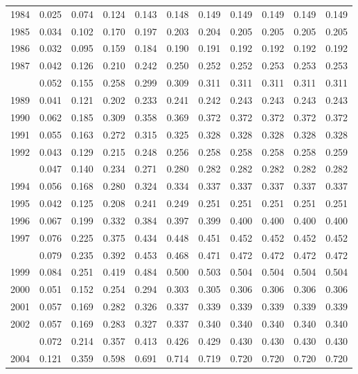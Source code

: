\documentclass[
]{article}
\begin{document}
\begin{longtable}[t]{lrrrrrrrrrr}
1984 & 0.025 & 0.074 & 0.124 & 0.143 & 0.148 & 0.149 & 0.149 & 0.149 & 0.149 & 0.149\\
1985 & 0.034 & 0.102 & 0.170 & 0.197 & 0.203 & 0.204 & 0.205 & 0.205 & 0.205 & 0.205\\
1986 & 0.032 & 0.095 & 0.159 & 0.184 & 0.190 & 0.191 & 0.192 & 0.192 & 0.192 & 0.192\\
1987 & 0.042 & 0.126 & 0.210 & 0.242 & 0.250 & 0.252 & 0.252 & 0.253 & 0.253 & 0.253\\
\addlinespace
1988 & 0.052 & 0.155 & 0.258 & 0.299 & 0.309 & 0.311 & 0.311 & 0.311 & 0.311 & 0.311\\
1989 & 0.041 & 0.121 & 0.202 & 0.233 & 0.241 & 0.242 & 0.243 & 0.243 & 0.243 & 0.243\\
1990 & 0.062 & 0.185 & 0.309 & 0.358 & 0.369 & 0.372 & 0.372 & 0.372 & 0.372 & 0.372\\
1991 & 0.055 & 0.163 & 0.272 & 0.315 & 0.325 & 0.328 & 0.328 & 0.328 & 0.328 & 0.328\\
1992 & 0.043 & 0.129 & 0.215 & 0.248 & 0.256 & 0.258 & 0.258 & 0.258 & 0.258 & 0.259\\
\addlinespace
1993 & 0.047 & 0.140 & 0.234 & 0.271 & 0.280 & 0.282 & 0.282 & 0.282 & 0.282 & 0.282\\
1994 & 0.056 & 0.168 & 0.280 & 0.324 & 0.334 & 0.337 & 0.337 & 0.337 & 0.337 & 0.337\\
1995 & 0.042 & 0.125 & 0.208 & 0.241 & 0.249 & 0.251 & 0.251 & 0.251 & 0.251 & 0.251\\
1996 & 0.067 & 0.199 & 0.332 & 0.384 & 0.397 & 0.399 & 0.400 & 0.400 & 0.400 & 0.400\\
1997 & 0.076 & 0.225 & 0.375 & 0.434 & 0.448 & 0.451 & 0.452 & 0.452 & 0.452 & 0.452\\
\addlinespace
1998 & 0.079 & 0.235 & 0.392 & 0.453 & 0.468 & 0.471 & 0.472 & 0.472 & 0.472 & 0.472\\
1999 & 0.084 & 0.251 & 0.419 & 0.484 & 0.500 & 0.503 & 0.504 & 0.504 & 0.504 & 0.504\\
2000 & 0.051 & 0.152 & 0.254 & 0.294 & 0.303 & 0.305 & 0.306 & 0.306 & 0.306 & 0.306\\
2001 & 0.057 & 0.169 & 0.282 & 0.326 & 0.337 & 0.339 & 0.339 & 0.339 & 0.339 & 0.339\\
2002 & 0.057 & 0.169 & 0.283 & 0.327 & 0.337 & 0.340 & 0.340 & 0.340 & 0.340 & 0.340\\
\addlinespace
2003 & 0.072 & 0.214 & 0.357 & 0.413 & 0.426 & 0.429 & 0.430 & 0.430 & 0.430 & 0.430\\
2004 & 0.121 & 0.359 & 0.598 & 0.691 & 0.714 & 0.719 & 0.720 & 0.720 & 0.720 & 0.720\\

\end{longtable}
\end{document}
